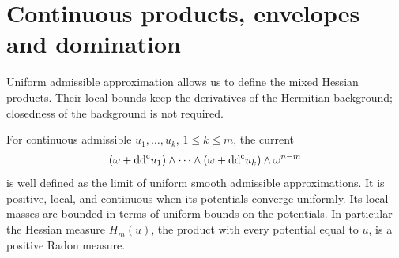 \section{Continuous products, envelopes and domination}
\label{sec:hessian-continuous-products}

Uniform admissible approximation allows us to define the mixed Hessian
products. Their local bounds keep the derivatives of the Hermitian
background; closedness of the background is not required.

\begin{proposition}\label{hessian:continuous-products}
For continuous admissible $u_1,\ldots,u_k$, $1\leq k\leq m$, the current
\[
 (\omega+\mathrm{dd}^{\mathrm{c}} u_1)\wedge\cdots\wedge(\omega+\mathrm{dd}^{\mathrm{c}} u_k)
                                          \wedge\omega^{n-m}
\]
is well defined as the limit of uniform smooth admissible approximations.
It is positive, local, and continuous when its potentials converge
uniformly. Its local masses are bounded in terms of uniform bounds on
the potentials. In particular the Hessian measure $H_m(u)$, the
product with every potential equal to $u$, is a positive Radon measure.
\end{proposition}
